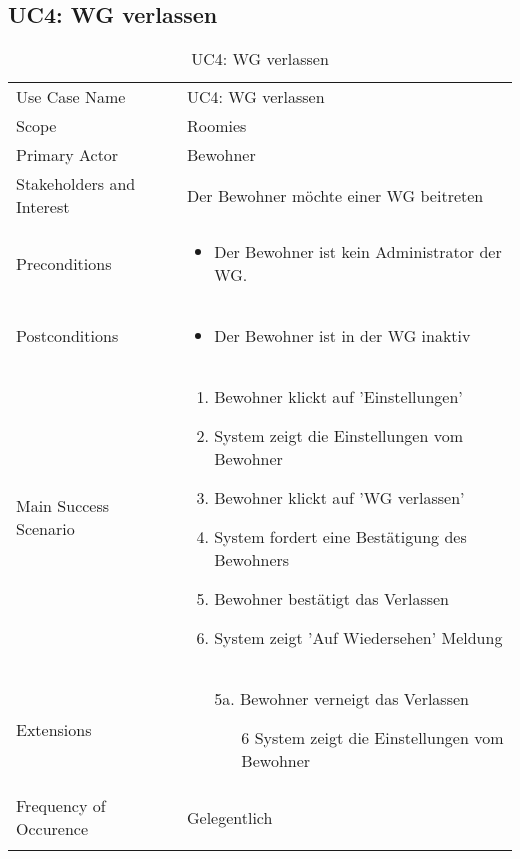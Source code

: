 \subsection{UC4: WG verlassen}
\begin{table}[H]
	\tablestyle
	\tablealtcolored
	\begin{tabularx}{\textwidth}{lX}
		\tablebody
			Use Case Name &
			UC4: WG verlassen
			\tabularnewline
			Scope &
			Roomies
			\tabularnewline
			Primary Actor &
			Bewohner
			\tabularnewline
			Stakeholders and Interest &
			Der Bewohner möchte einer WG beitreten
			\tabularnewline
			Preconditions &
			\begin{itemize}
				\item Der Bewohner ist kein Administrator der WG.
			\end{itemize}
			\tabularnewline
			Postconditions &
			\begin{itemize}
				\item Der Bewohner ist in der WG inaktiv
			\end{itemize}
			\tabularnewline
			Main Success Scenario &
			\begin{enumerate}
				\item Bewohner klickt auf 'Einstellungen'
				\item System zeigt die Einstellungen vom Bewohner
				\item Bewohner klickt auf 'WG verlassen'
				\item System fordert eine Bestätigung des Bewohners
				\item Bewohner bestätigt das Verlassen
				\item System zeigt 'Auf Wiedersehen' Meldung
			\end{enumerate}
			\tabularnewline
			Extensions &
			\begin{itemize}
				\item[5a.] Bewohner verneigt das Verlassen
				\begin{itemize}
					\item[6] System zeigt die Einstellungen vom Bewohner
				\end{itemize}
			\end{itemize}
			\tabularnewline
			Frequency of Occurence &
			Gelegentlich
			\tabularnewline
		\tableend
	\end{tabularx}
	\caption{UC4: WG verlassen}
\end{table}


